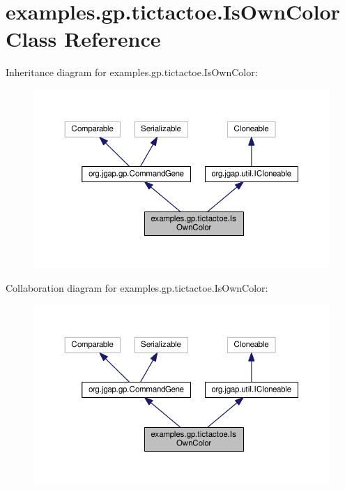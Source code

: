 \hypertarget{classexamples_1_1gp_1_1tictactoe_1_1_is_own_color}{\section{examples.\-gp.\-tictactoe.\-Is\-Own\-Color Class Reference}
\label{classexamples_1_1gp_1_1tictactoe_1_1_is_own_color}
}


Inheritance diagram for examples.\-gp.\-tictactoe.\-Is\-Own\-Color\-:
\nopagebreak
\begin{figure}[H]
\begin{center}
\leavevmode
\includegraphics[width=350pt]{classexamples_1_1gp_1_1tictactoe_1_1_is_own_color__inherit__graph}
\end{center}
\end{figure}


Collaboration diagram for examples.\-gp.\-tictactoe.\-Is\-Own\-Color\-:
\nopagebreak
\begin{figure}[H]
\begin{center}
\leavevmode
\includegraphics[width=350pt]{classexamples_1_1gp_1_1tictactoe_1_1_is_own_color__coll__graph}
\end{center}
\end{figure}
